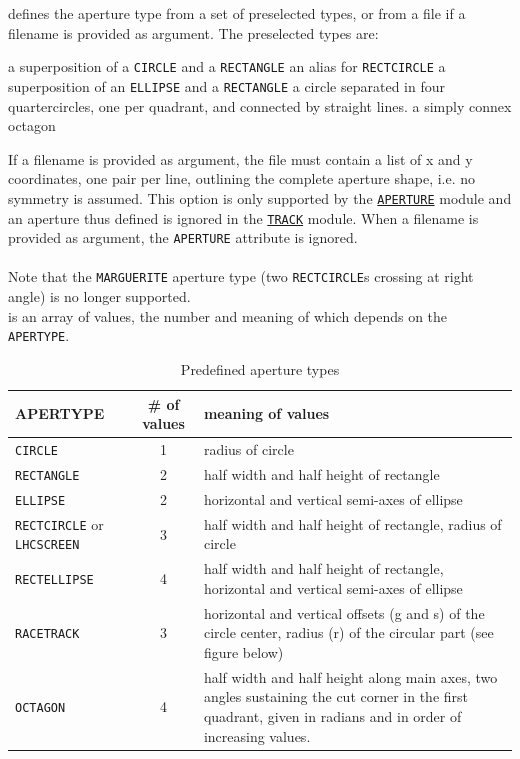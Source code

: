 \begin{madlist}
   defines the aperture type from a set of
  preselected types, or from a file if a filename is provided as argument.
  The preselected types are:
    \begin{madlist}
       a superposition of a {\tt CIRCLE} and
        a {\tt RECTANGLE} 
       an alias for {\tt RECTCIRCLE}
       a superposition of an {\tt ELLIPSE} and a
        {\tt RECTANGLE}
       a circle separated in four
      quartercircles, one per quadrant, and connected by straight lines.
       a simply connex octagon
    \end{madlist}
    If a filename is provided as argument, the file must contain a 
    list of x and y coordinates, one pair per line, outlining the complete aperture shape, 
    i.e. no symmetry is assumed. This option is only supported by the 
    \hyperref[chap:aperture]{\tt APERTURE} module and an aperture thus defined is 
    ignored in the \hyperref[chap:thintrack]{\tt TRACK} module.
    When a filename is provided as argument, the {\tt APERTURE} attribute is ignored.\\
\\
Note that the {\tt MARGUERITE} aperture type (two {\tt RECTCIRCLE}s 
crossing at right angle) is no longer supported. 
\\
   is an array of values, the number and meaning 
of which depends on the {\tt APERTYPE}.  
\end{madlist}

\begin{table}[ht]
	\caption{Predefined aperture types}
	\vspace{1ex}
	\begin{tabular}{|l | c | p{8cm}|}
		\hline 
		{\bf APERTYPE} & {\bf \# of values} & {\bf meaning of values}\\
		\hline
		{\tt CIRCLE} & 1 &  radius of circle \\ 
		\hline
		{\tt RECTANGLE} & 2 & half width and half height of rectangle\\ 
		\hline
		{\tt ELLIPSE} & 2 & horizontal and vertical semi-axes of ellipse \\  
		\hline
		{\tt RECTCIRCLE} or {\tt LHCSCREEN} & 3 & half width and half height of 
		rectangle, radius of circle\\  
		\hline
		{\tt RECTELLIPSE} & 4 & half width and half height of rectangle, 
		horizontal and vertical semi-axes of ellipse \\
		\hline
		{\tt RACETRACK} & 3 & horizontal and vertical offsets (g and s) of the 
		circle center, radius (r) of the circular part (see figure below)\\
		\hline
		{\tt OCTAGON} & 4 & half width and half height along main axes, 
		two angles sustaining the cut corner in the first quadrant, 
		given in radians and in order of increasing values. \\   
		\hline
	\end{tabular}
\end{table}

